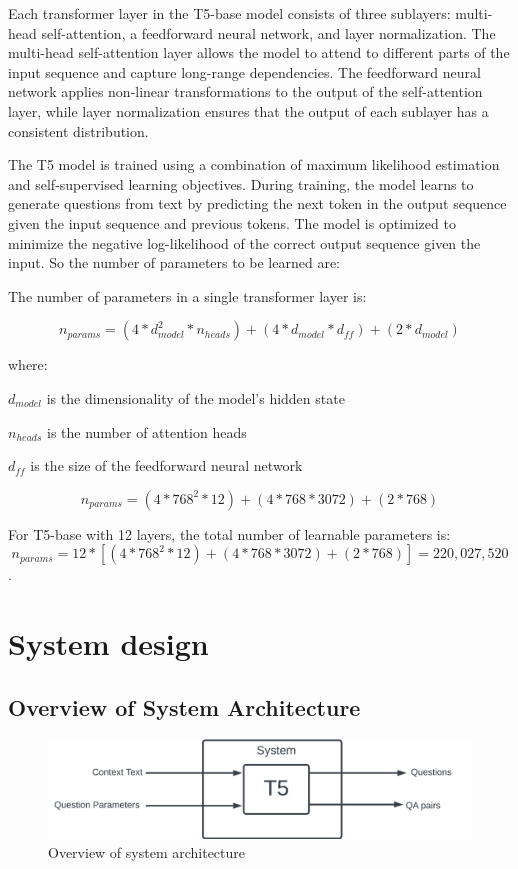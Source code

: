 \documentclass[12pt]{report}
\begin{document}
Each transformer layer in the T5-base model consists of three sublayers: multi-head self-attention, a feedforward neural network, and layer normalization. The multi-head self-attention layer allows the model to attend to different parts of the input sequence and capture long-range dependencies. The feedforward neural network applies non-linear transformations to the output of the self-attention layer, while layer normalization ensures that the output of each sublayer has a consistent distribution.

The T5 model is trained using a combination of maximum likelihood estimation and self-supervised learning objectives. During training, the model learns to generate questions from text by predicting the next token in the output sequence given the input sequence and previous tokens. The model is optimized to minimize the negative log-likelihood of the correct output sequence given the input.
So the number of parameters to be learned are: 

The number of parameters in a single transformer layer is:

\begin{equation}
n_{params} = (4 * d_{model}^2 * n_{heads}) + (4 * d_{model} * d_{ff}) + (2 * d_{model})
\end{equation}

where:

$d_{model}$ is the dimensionality of the model's hidden state

$n_{heads}$ is the number of attention heads

$d_{ff}$ is the size of the feedforward neural network

\begin{equation*}
n_{params} = (4 * 768^2 * 12) + (4 * 768 * 3072) + (2 * 768)
\end{equation*}

For T5-base with 12 layers, the total number of learnable parameters is: 
\begin{equation*}
n_{params} = 12 * [(4 * 768^2 * 12) + (4 * 768 * 3072) + (2 * 768)] = 220,027,520
\end{equation*}
.


\chapter{System design}
\section{Overview of System Architecture}
\begin{figure}[ht!]
    \centering
    \includegraphics[scale= 1]{Images/Overview.png}
    \caption{Overview of system architecture}
\end{figure}
\end{document}
